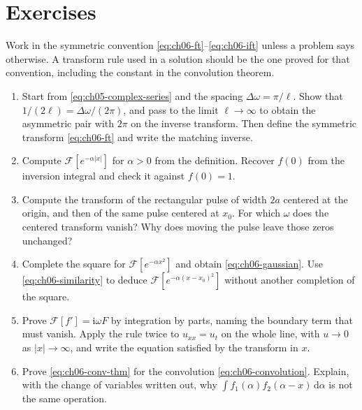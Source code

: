 \section*{Exercises}
Work in the symmetric convention \eqref{eq:ch06-ft}--\eqref{eq:ch06-ift} unless a problem says otherwise. A transform rule used in a solution should be the one proved for that convention, including the constant in the convolution theorem.

\renewcommand{\theenumi}{\thechapter.\arabic{enumi}}
\renewcommand{\labelenumi}{\theenumi.}
\begin{enumerate}
    \item\label{ex:fourier-transform-limit} Start from \eqref{eq:ch05-complex-series} and the spacing $\Delta\omega=\pi/\ell$. Show that $1/(2\ell)=\Delta\omega/(2\pi)$, and pass to the limit $\ell\to\infty$ to obtain the asymmetric pair with $2\pi$ on the inverse transform. Then define the symmetric transform \eqref{eq:ch06-ft} and write the matching inverse.

    \item\label{ex:fourier-exponential} Compute $\mathcal{F}[e^{-\alpha|x|}]$ for $\alpha>0$ from the definition. Recover $f(0)$ from the inversion integral and check it against $f(0)=1$.

    \item\label{ex:fourier-rect} Compute the transform of the rectangular pulse of width $2a$ centered at the origin, and then of the same pulse centered at $x_0$. For which $\omega$ does the centered transform vanish? Why does moving the pulse leave those zeros unchanged?

    \item\label{ex:fourier-gaussian} Complete the square for $\mathcal{F}[e^{-\alpha x^2}]$ and obtain \eqref{eq:ch06-gaussian}. Use \eqref{eq:ch06-similarity} to deduce $\mathcal{F}[e^{-\alpha(x-x_0)^2}]$ without another completion of the square.

    \item\label{ex:fourier-derivative} Prove $\mathcal{F}[f']=\mathrm{i}\omega F$ by integration by parts, naming the boundary term that must vanish. Apply the rule twice to $u_{xx}=u_t$ on the whole line, with $u\to 0$ as $|x|\to\infty$, and write the equation satisfied by the transform in $x$.

    \item\label{ex:fourier-convolution} Prove \eqref{eq:ch06-conv-thm} for the convolution \eqref{eq:ch06-convolution}. Explain, with the change of variables written out, why $\int f_1(\alpha)f_2(\alpha-x)\,\mathrm{d}\alpha$ is not the same operation.


\end{enumerate}
